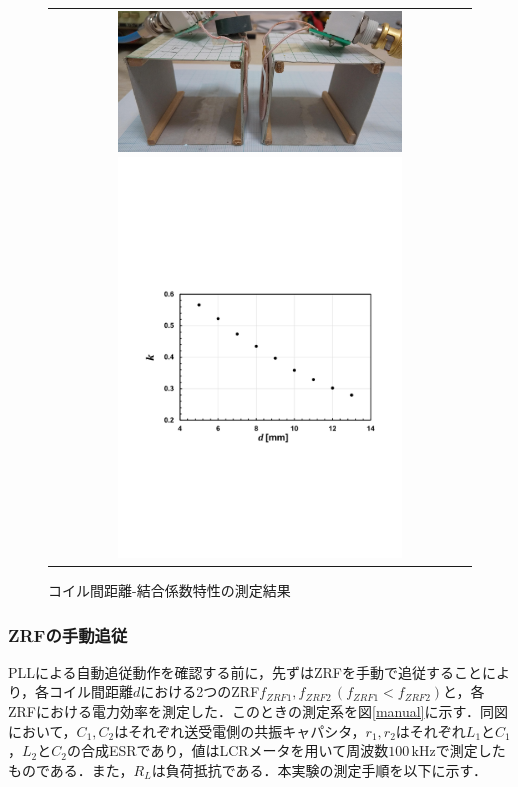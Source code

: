 \begin{figure}[h]
  \centering
    \begin{tabular}{c}
       \begin{minipage}{0.50\hsize}
        \centering
          \includegraphics[width=75mm]{figures/coilphoto.jpg}
                          \caption{結合係数特性の測定風景}
                          \label{coilphoto}
      \end{minipage}
  \hspace{5mm}
      \begin{minipage}{0.50\hsize}
        \centering
          \includegraphics[width=75mm]{figures/dvskgraph.pdf}
                          \caption{コイル間距離-結合係数特性の測定結果}
						  \label{dvskgraph}
      \end{minipage} \\
     \end{tabular}
\end{figure}  


\subsubsection{ZRFの手動追従}
PLLによる自動追従動作を確認する前に，先ずはZRFを手動で追従することにより，各コイル間距離$d$における2つのZRF$f_{ZRF1},f_{ZRF2} \, (f_{ZRF1}<f_{ZRF2})$と，各ZRFにおける電力効率を測定した．このときの測定系を図\ref{manual}に示す．同図において，$C_1, C_2$はそれぞれ送受電側の共振キャパシタ，$r_{1},r_{2}$はそれぞれ$L_1$と$C_1$，$L_2$と$C_2$の合成ESRであり，値はLCRメータを用いて周波数$100 \, \mathrm{kHz}$で測定したものである．また，$R_L$は負荷抵抗である．本実験の測定手順を以下に示す．

